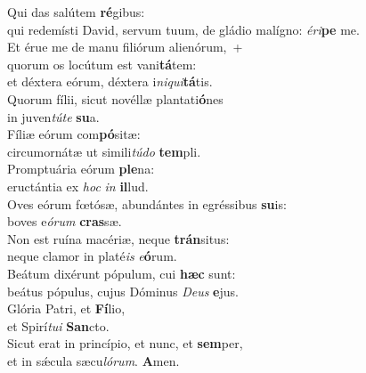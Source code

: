 \evenverse Qui das salútem \textbf{ré}gibus:~\*\\
\evenverse qui redemísti David, servum tuum, de gládio malígno: \textit{é}\textit{ri}\textbf{pe} me.\\
\oddverse Et érue me de manu filiórum alienórum,~+\\
\oddverse  quorum os locútum est vani\textbf{tá}tem:~\*\\
\oddverse et déxtera eórum, déxtera i\textit{ni}\textit{qui}\textbf{tá}tis.\\
\evenverse Quorum fílii, sicut novéllæ plantati\textbf{ó}nes~\*\\
\evenverse in juven\textit{tú}\textit{te} \textbf{su}a.\\
\oddverse Fíliæ eórum com\textbf{pó}sitæ:~\*\\
\oddverse circumornátæ ut simili\textit{tú}\textit{do} \textbf{tem}pli.\\
\evenverse Promptuária eórum \textbf{ple}na:~\*\\
\evenverse eructántia ex \textit{hoc} \textit{in} \textbf{il}lud.\\
\oddverse Oves eórum fœtósæ, abundántes in egréssibus \textbf{su}is:~\*\\
\oddverse boves e\textit{ó}\textit{rum} \textbf{cras}sæ.\\
\evenverse Non est ruína macériæ, neque \textbf{trán}situs:~\*\\
\evenverse neque clamor in platé\textit{is} \textit{e}\textbf{ó}rum.\\
\oddverse Beátum dixérunt pópulum, cui \textbf{hæc} sunt:~\*\\
\oddverse beátus pópulus, cujus Dóminus \textit{De}\textit{us} \textbf{e}jus.\\
\evenverse Glória Patri, et \textbf{Fí}lio,~\*\\
\evenverse et Spirí\textit{tu}\textit{i} \textbf{San}cto.\\
\oddverse Sicut erat in princípio, et nunc, et \textbf{sem}per,~\*\\
\oddverse et in sǽcula sæcu\textit{ló}\textit{rum}. \textbf{A}men.\\
